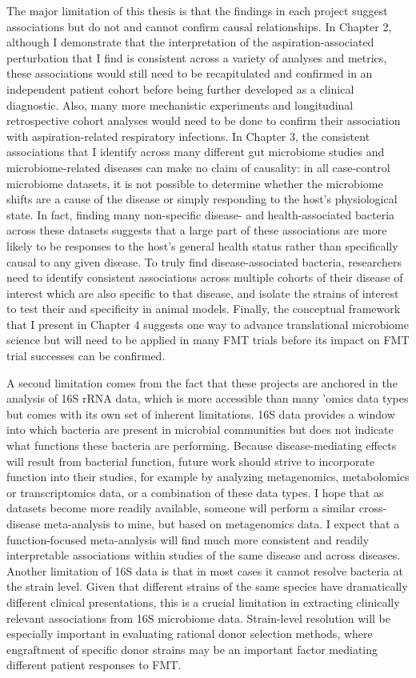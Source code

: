 The major limitation of this thesis is that the findings in each project suggest associations but do not and cannot confirm causal relationships.
In Chapter 2, although I demonstrate that the interpretation of the aspiration-associated perturbation that I find is consistent across a variety of analyses and metrics, these associations would still need to be recapitulated and confirmed in an independent patient cohort before being further developed as a clinical diagnostic.
Also, many more mechanistic experiments and longitudinal retrospective cohort analyses would need to be done to confirm their association with aspiration-related respiratory infections.
In Chapter 3, the consistent associations that I identify across many different gut microbiome studies and microbiome-related diseases can make no claim of causality: in all case-control microbiome datasets, it is not possible to determine whether the microbiome shifts are a cause of the disease or simply responding to the host's physiological state.
In fact, finding many non-specific disease- and health-associated bacteria across these datasets suggests that a large part of these associations are more likely to be responses to the host's general health status rather than specifically causal to any given disease.
To truly find disease-associated bacteria, researchers need to identify consistent associations across multiple cohorts of their disease of interest which are also specific to that disease, and isolate the strains of interest to test their and specificity in animal models.
Finally, the conceptual framework that I present in Chapter 4 suggests one way to advance translational microbiome science but will need to be applied in many FMT trials before its impact on FMT trial successes can be confirmed.

A second limitation comes from the fact that these projects are anchored in the analysis of 16S rRNA data, which is more accessible than many 'omics data types but comes with its own set of inherent limitations.
16S data provides a window into which bacteria are present in microbial communities but does not indicate what functions these bacteria are performing.
Because disease-mediating effects will result from bacterial function, future work should strive to incorporate function into their studies, for example by analyzing metagenomics, metabolomics or transcriptomics data, or a combination of these data types.
I hope that as datasets become more readily available,  someone will perform a similar cross-disease meta-analysis to mine, but based on metagenomics data.
I expect that a function-focused meta-analysis will find much more consistent and readily interpretable associations within studies of the same disease and across diseases.
Another limitation of 16S data is that in most cases it cannot resolve bacteria at the strain level.
Given that different strains of the same species have dramatically different clinical presentations, this is a crucial limitation in extracting clinically relevant associations from 16S microbiome data.
Strain-level resolution will be especially important in evaluating rational donor selection methods, where engraftment of specific donor strains may be an important factor mediating different patient responses to FMT.

